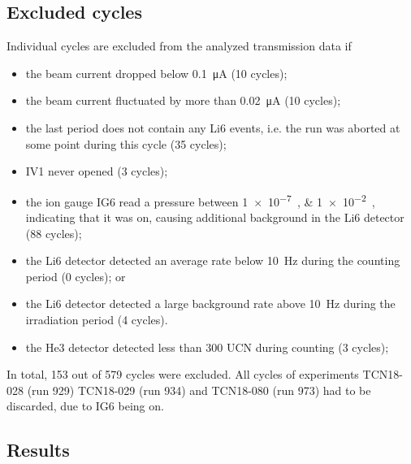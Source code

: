 \documentclass[10pt,letterpaper]{article}
\begin{document}
\subsection{Excluded cycles}

Individual cycles are excluded from the analyzed transmission data if
\begin{itemize}
\item the beam current dropped below \SI{0.1}{\micro\ampere} (10 cycles);
\item the beam current fluctuated by more than \SI{0.02}{\micro\ampere} (10 cycles);
\item the last period does not contain any Li6 events, i.e. the run was aborted at some point during this cycle (35 cycles);
\item IV1 never opened (3 cycles);
\item the ion gauge IG6 read a pressure between \SIlist{1e-7;1e-2}{\torr}, indicating that it was on, causing additional background in the Li6 detector (88 cycles);
\item the Li6 detector detected an average rate below \SI{10}{\hertz} during the counting period (0 cycles); or
\item the Li6 detector detected a large background rate above \SI{10}{\hertz} during the irradiation period (4 cycles).
\item the He3 detector detected less than 300 UCN during counting (3 cycles);
\end{itemize}

In total, 153 out of 579 cycles were excluded. All cycles of experiments TCN18-028 (run 929)  TCN18-029 (run 934) and TCN18-080 (run 973) had to be discarded, due to IG6 being on.

\subsection{Results}
\end{document}
